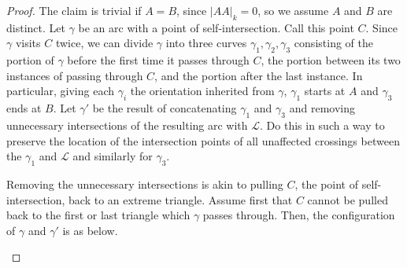 \documentclass[10pt,a4paper]{amsart}
\begin{document}
\begin{proof}
The claim is trivial if $A = B$, since $\vert AA \vert_k = 0$, so we assume $A$ and $B$ are distinct. Let $\gamma$ be an arc with a point of self-intersection. Call this point $C$. Since $\gamma$ visits $C$ twice, we can divide $\gamma$ into three curves $\gamma_1,\gamma_2,\gamma_3$ consisting of the portion of $\gamma$ before the first time it passes through $C$, the portion between its two instances of passing through $C$, and the portion after the last instance.  In particular, giving each $\gamma_i$ the orientation inherited from $\gamma$, $\gamma_1$ starts at $A$ and $\gamma_3$ ends at $B$.  Let $\gamma'$ be the result of concatenating $\gamma_1$ and $\gamma_3$ and removing unnecessary intersections of the resulting arc with $\mathcal{L}$. Do this in such a way to preserve the location of the intersection points of all unaffected crossings between the $\gamma_1$ and $\mathcal{L}$ and similarly for $\gamma_3$. 

Removing the unnecessary intersections is akin to pulling $C$, the point of self-intersection, back to an extreme triangle. Assume first that $C$ cannot be pulled back to the first or last triangle which $\gamma$ passes through. Then, the configuration of $\gamma$ and $\gamma'$ is as below. 

\begin{center}
\end{center}



\end{proof}
\end{document}
